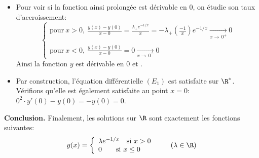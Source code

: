 {\begin{enumerate}
{\begin{itemize}
\item Pour voir si la fonction ainsi prolongée est dérivable en 0, on étudie son taux d'accroissement:
$$\left\{\begin{array}{l}
\text{pour}\ x>0,\ \frac{y(x)-y(0)}{x-0}=\frac{\lambda_+e^{-1/x}}{x}=-\lambda_+(\frac{-1}{x})e^{-1/x}\xrightarrow[x\to\,0^+]{}0\\
\ \\
\text{pour}\ x<0,\ \frac{y(x)-y(0)}{x-0}=0\xrightarrow[x\to\,0^-]{}0
\end{array}\right.$$
Ainsi la fonction $y$ est dérivable en 0 et .
\item Par construction, l'équation différentielle $(E_1)$ est satisfaite sur $\R^*$. 
Vérifions qu'elle est également satisfaite au point $x=0$: $0^2 \cdot y'(0)-y(0)=-y(0)=0$.
\end{itemize}
\textbf{Conclusion.}  
Finalement, les solutions sur $\R$ sont exactement les fonctions suivantes: 
$$y(x)=\left\lbrace\begin{array}{l}
\lambda e^{-1/x}\quad \text{si}\ x>0\\
0\qquad \text{si}\ x\le 0
\end{array}\right. \qquad (\lambda\in\R)$$
}
\end{enumerate}
}
